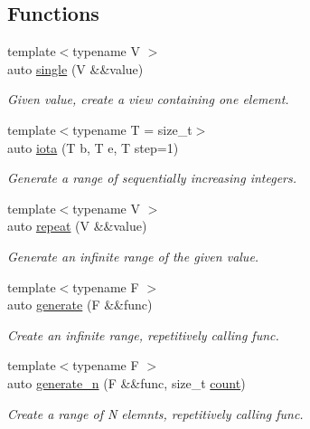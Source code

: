 \subsection*{Functions}
\begin{DoxyCompactItemize}
\item 
{\footnotesize template$<$typename V $>$ }\\auto \mbox{\hyperlink{namespacerah_1_1view_ad37c24275c6eb4642a20466545a9baa3}{single}} (V \&\&value)
\begin{DoxyCompactList}\small\item\em Given value, create a view containing one element. \end{DoxyCompactList}\item 
{\footnotesize template$<$typename T  = size\+\_\+t$>$ }\\auto \mbox{\hyperlink{namespacerah_1_1view_ae66c3be408888c58118b1974cdece592}{iota}} (T b, T e, T step=1)
\begin{DoxyCompactList}\small\item\em Generate a range of sequentially increasing integers. \end{DoxyCompactList}\item 
{\footnotesize template$<$typename V $>$ }\\auto \mbox{\hyperlink{namespacerah_1_1view_abd22c411fe9e0bea622ba7f829743362}{repeat}} (V \&\&value)
\begin{DoxyCompactList}\small\item\em Generate an infinite range of the given value. \end{DoxyCompactList}\item 
{\footnotesize template$<$typename F $>$ }\\auto \mbox{\hyperlink{namespacerah_1_1view_a9851b1ee90ae15252fb248417e084f69}{generate}} (F \&\&func)
\begin{DoxyCompactList}\small\item\em Create an infinite range, repetitively calling func. \end{DoxyCompactList}\item 
{\footnotesize template$<$typename F $>$ }\\auto \mbox{\hyperlink{namespacerah_1_1view_a2be56bf9b855cf33b152868326d78958}{generate\+\_\+n}} (F \&\&func, size\+\_\+t \mbox{\hyperlink{namespacerah_aa528865cc4a45d4eb276329554f16b4b}{count}})
\begin{DoxyCompactList}\small\item\em Create a range of N elemnts, repetitively calling func. \end{DoxyCompactList}\item 

\end{DoxyCompactItemize}
